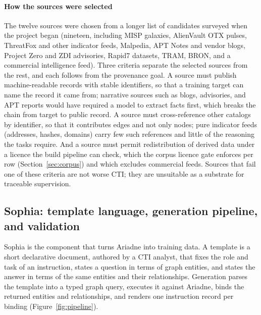 \documentclass[twocolumn]{svjour3}
\begin{document}
\paragraph{How the sources were selected}
The twelve sources were chosen from a longer list of candidates surveyed when the project began (nineteen, including MISP galaxies, AlienVault OTX pulses, ThreatFox and other indicator feeds, Malpedia, APT Notes and vendor blogs, Project Zero and ZDI advisories, Rapid7 datasets, TRAM, BRON, and a commercial intelligence feed). Three criteria separate the selected sources from the rest, and each follows from the provenance goal. A source must publish machine-readable records with stable identifiers, so that a training target can name the record it came from; narrative sources such as blogs, advisories, and APT reports would have required a model to extract facts first, which breaks the chain from target to public record. A source must cross-reference other catalogs by identifier, so that it contributes edges and not only nodes; pure indicator feeds (addresses, hashes, domains) carry few such references and little of the reasoning the tasks require. And a source must permit redistribution of derived data under a licence the build pipeline can check, which the corpus licence gate enforces per row (Section~\ref{sec:corpus}) and which excludes commercial feeds. Sources that fail one of these criteria are not worse CTI; they are unsuitable as a substrate for traceable supervision.

\subsection{Sophia: template language, generation pipeline, and validation}\label{sec:sophia}
Sophia is the component that turns Ariadne into training data. A template is a short declarative document, authored by a CTI analyst, that fixes the role and task of an instruction, states a question in terms of graph entities, and states the answer in terms of the same entities and their relationships. Generation parses the template into a typed graph query, executes it against Ariadne, binds the returned entities and relationships, and renders one instruction record per binding (Figure~\ref{fig:pipeline}).
\end{document}
